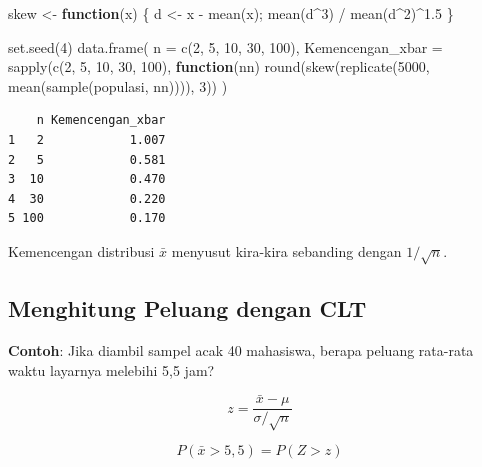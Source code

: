 \documentclass[
  indonesian,
  letterpaper,
]{book}
\newenvironment{Shaded}{\begin{snugshade}}{\end{snugshade}}
\newcommand{\AttributeTok}[1]{\textcolor[rgb]{0.40,0.45,0.13}{#1}}
\newcommand{\ControlFlowTok}[1]{\textcolor[rgb]{0.00,0.23,0.31}{\textbf{#1}}}
\newcommand{\DecValTok}[1]{\textcolor[rgb]{0.68,0.00,0.00}{#1}}
\newcommand{\FloatTok}[1]{\textcolor[rgb]{0.68,0.00,0.00}{#1}}
\newcommand{\FunctionTok}[1]{\textcolor[rgb]{0.28,0.35,0.67}{#1}}
\newcommand{\NormalTok}[1]{\textcolor[rgb]{0.00,0.23,0.31}{#1}}
\newcommand{\OtherTok}[1]{\textcolor[rgb]{0.00,0.23,0.31}{#1}}
\newcommand{\SpecialCharTok}[1]{\textcolor[rgb]{0.37,0.37,0.37}{#1}}
\begin{document}
\begin{Shaded}
\begin{Highlighting}[]
\NormalTok{skew }\OtherTok{\textless{}{-}} \ControlFlowTok{function}\NormalTok{(x) \{ d }\OtherTok{\textless{}{-}}\NormalTok{ x }\SpecialCharTok{{-}} \FunctionTok{mean}\NormalTok{(x); }\FunctionTok{mean}\NormalTok{(d}\SpecialCharTok{\^{}}\DecValTok{3}\NormalTok{) }\SpecialCharTok{/} \FunctionTok{mean}\NormalTok{(d}\SpecialCharTok{\^{}}\DecValTok{2}\NormalTok{)}\SpecialCharTok{\^{}}\FloatTok{1.5}\NormalTok{ \}}

\FunctionTok{set.seed}\NormalTok{(}\DecValTok{4}\NormalTok{)}
\FunctionTok{data.frame}\NormalTok{(}
  \AttributeTok{n =} \FunctionTok{c}\NormalTok{(}\DecValTok{2}\NormalTok{, }\DecValTok{5}\NormalTok{, }\DecValTok{10}\NormalTok{, }\DecValTok{30}\NormalTok{, }\DecValTok{100}\NormalTok{),}
  \AttributeTok{Kemencengan\_xbar =} \FunctionTok{sapply}\NormalTok{(}\FunctionTok{c}\NormalTok{(}\DecValTok{2}\NormalTok{, }\DecValTok{5}\NormalTok{, }\DecValTok{10}\NormalTok{, }\DecValTok{30}\NormalTok{, }\DecValTok{100}\NormalTok{), }\ControlFlowTok{function}\NormalTok{(nn)}
    \FunctionTok{round}\NormalTok{(}\FunctionTok{skew}\NormalTok{(}\FunctionTok{replicate}\NormalTok{(}\DecValTok{5000}\NormalTok{, }\FunctionTok{mean}\NormalTok{(}\FunctionTok{sample}\NormalTok{(populasi, nn)))), }\DecValTok{3}\NormalTok{))}
\NormalTok{)}
\end{Highlighting}
\end{Shaded}

\begin{verbatim}
    n Kemencengan_xbar
1   2            1.007
2   5            0.581
3  10            0.470
4  30            0.220
5 100            0.170
\end{verbatim}

Kemencengan distribusi \(\bar{x}\) menyusut kira-kira sebanding dengan
\(1/\sqrt{n}\).

\subsection{Menghitung Peluang dengan
CLT}\label{menghitung-peluang-dengan-clt}

\textbf{Contoh}: Jika diambil sampel acak 40 mahasiswa, berapa peluang
rata-rata waktu layarnya melebihi 5,5 jam?

\[
z = \frac{\bar{x}-\mu}{\sigma/\sqrt{n}}
\]

\[
P(\bar{x}>5{,}5)=P(Z>z)
\]
\end{document}
